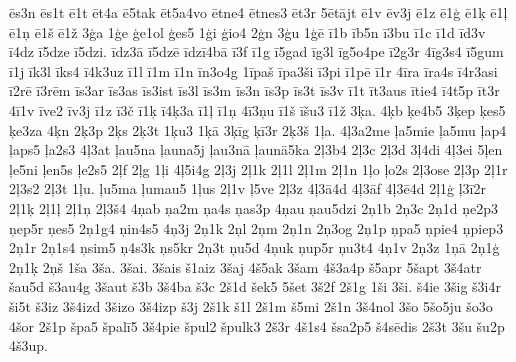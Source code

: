 {{\={e}s3n \={e}s1t \={e}1t \={e}t4a \={e}5tak \={e}t5a4vo \={e}tne4
\={e}tnes3 \={e}t3r 5\={e}t\={a}jt \={e}1v \={e}v3j \={e}1z
\={e}1\c{g} \={e}1\c{k} \={e}1\c{l} \={e}1\c{n} \={e}1\v{s}
\={e}1\v{z} 3\c{g}a 1\c{g}e \c{g}e1ol \c{g}es5 1\c{g}i
\c{g}io4 2\c{g}n 3\c{g}u 1\c{g}\={e} \={i}1b \={i}b5n \={i}3bu
\={i}1c \={i}1d \={i}d3v \={i}4dz \={i}5dze \={i}5dzi. \={i}dz3\={a}
\={i}5dz\={e} \={i}dz\={i}4b\={a} \={i}3f \={i}1g \={i}5gad
\={i}g3l \={i}g5o4pe \={i}2g3r 4\={i}g3s4 \={i}5gum \={i}1j
\={i}k3l \={i}ks4 \={i}4k3uz \={i}1l \={i}1m \={i}1n \={i}n3o4g
1\={i}pa\v{s} \={i}pa3\v{s}i \={i}3pi \={i}1p\={e} \={i}1r
4\={i}ra \={i}ra4s \={i}4r3asi \={i}2r\={e} \={i}3r\={e}m
\={i}s3ar \={i}s3as \={i}s3ist \={i}s3l \={i}s3m \={i}s3n
\={i}s3p \={i}s3t \={i}s3v \={i}1t \={i}t3aus \={i}tie4 \={i}4t5p
\={i}t3r 4\={i}1v \={i}ve2 \={i}v3j \={i}1z \={i}3\v{c} \={i}1\c{k}
\={i}4\c{k}3a \={i}1\c{l} \={i}1\c{n} 4\={i}3\c{n}u \={i}1\v{s}
\={i}\v{s}u3 \={i}1\v{z} 3\c{k}a. 4\c{k}b \c{k}e4b5 3\c{k}ep
\c{k}es5 \c{k}e3za 4\c{k}n 2\c{k}3p 2\c{k}s 2\c{k}3t 1\c{k}u3
1\c{k}\={a} 3\c{k}\={i}g \c{k}\={i}3r 2\c{k}3\v{s} 1\c{l}a.
4\c{l}3a2me \c{l}a5mie \c{l}a5mu \c{l}ap4 \c{l}aps5 \c{l}a2s3
4\c{l}3at \c{l}au5na \c{l}auna5j \c{l}au3n\={a} \c{l}aun\={a}5ka
2\c{l}3b4 2\c{l}3c 2\c{l}3d 3\c{l}4di 4\c{l}3ei 5\c{l}en
\c{l}e5ni \c{l}en5s \c{l}e2s5 2\c{l}f 2\c{l}g 1\c{l}i 4\c{l}5i4g
2\c{l}3j 2\c{l}1k 2\c{l}1l 2\c{l}1m 2\c{l}1n 1\c{l}o \c{l}o2s
2\c{l}3ose 2\c{l}3p 2\c{l}1r 2\c{l}3s2 2\c{l}3t 1\c{l}u. \c{l}u5ma
\c{l}umau5 1\c{l}us 2\c{l}1v \c{l}5ve 2\c{l}3z 4\c{l}3\={a}4d
4\c{l}3\={a}f 4\c{l}3\={e}4d 2\c{l}1\c{g} \c{l}3\={i}2r
2\c{l}1\c{k} 2\c{l}1\c{l} 2\c{l}1\c{n} 2\c{l}3\v{s}4
4\c{n}ab \c{n}a2m \c{n}a4s \c{n}as3p 4\c{n}au \c{n}au5dzi
2\c{n}1b 2\c{n}3c 2\c{n}1d \c{n}e2p3 \c{n}ep5r \c{n}es5
2\c{n}1g4 \c{n}in4s5 4\c{n}3j 2\c{n}1k 2\c{n}l 2\c{n}m 2\c{n}1n
2\c{n}3og 2\c{n}1p \c{n}pa5 \c{n}pie4 \c{n}piep3 2\c{n}1r
2\c{n}1s4 \c{n}sim5 \c{n}4s3k \c{n}s5kr 2\c{n}3t \c{n}u5d
4\c{n}uk \c{n}up5r \c{n}u3t4 4\c{n}1v 2\c{n}3z 1\c{n}\={a}
2\c{n}1\c{g} 2\c{n}1\c{k} 2\c{n}\v{s} 1\v{s}a 3\v{s}a.
3\v{s}ai. 3\v{s}ais \v{s}1aiz 3\v{s}aj 4\v{s}5ak 3\v{s}am
4\v{s}3a4p \v{s}5apr 5\v{s}apt 3\v{s}4atr \v{s}au5d \v{s}3au4g
3\v{s}aut \v{s}3b 3\v{s}4ba \v{s}3c 2\v{s}1d \v{s}ek5 5\v{s}et
3\v{s}2f 2\v{s}1g 1\v{s}i 3\v{s}i. \v{s}4ie 3\v{s}ig \v{s}3i4r
\v{s}i5t \v{s}3iz 3\v{s}4izd 3\v{s}izo 3\v{s}4izp \v{s}3j
2\v{s}1k \v{s}1l 2\v{s}1m \v{s}5mi 2\v{s}1n 3\v{s}4nol 3\v{s}o
5\v{s}o5ju \v{s}o3o 4\v{s}or 2\v{s}1p \v{s}pa5 \v{s}pal\={i}5
3\v{s}4pie \v{s}pul2 \v{s}pulk3 2\v{s}3r 4\v{s}1s4
\v{s}sa2p5 \v{s}4s\={e}dis 2\v{s}3t 3\v{s}u \v{s}u2p 4\v{s}3up.
}}
